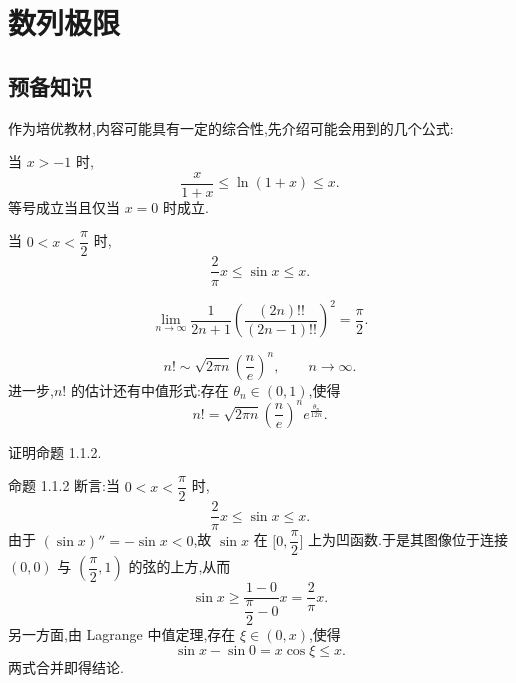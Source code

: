 \setcounter{chapter}{0}
\pagestyle{fancy}

\chapter{数列极限}


\section{预备知识}

作为培优教材,内容可能具有一定的综合性,先介绍可能会用到的几个公式:

\begin{proposition}
  当 $x>-1$ 时,
  \[
    \dfrac{x}{1+x}\leq \ln(1+x)\leq x.
  \]
  等号成立当且仅当 $x=0$ 时成立.
\end{proposition}

\begin{proposition}[\marktwostar]
  当 $0<x<\dfrac{\pi}{2}$ 时,
  \[
    \dfrac{2}{\pi}x\leq \sin x\leq x.
  \]
\end{proposition}

\begin{theorem}
  \[
    \displaystyle\lim\limits_{n\to\infty}
    \dfrac{1}{2n+1}
    \left(\dfrac{(2n)!!}{(2n-1)!!}\right)^2
    =\dfrac{\pi}{2}.
  \]
\end{theorem}

\begin{theorem}
  \[
    n!\sim \sqrt{2\pi n}\left(\dfrac{n}{e}\right)^n,
    \qquad n\to\infty.
  \]
  进一步,$n!$ 的估计还有中值形式:存在 $\theta_n\in(0,1)$,使得
  \[
    n!
    =\sqrt{2\pi n}\left(\dfrac{n}{e}\right)^n
    e^{\frac{\theta_n}{12n}}.
  \]
\end{theorem}

\begin{example}
  证明命题 1.1.2.
\end{example}
\exampleblank

\begin{solution}
  命题 1.1.2 断言:当 $0<x<\dfrac{\pi}{2}$ 时,
  \[
    \dfrac{2}{\pi}x\leq \sin x\leq x.
  \]
  由于 $(\sin x)''=-\sin x<0$,故 $\sin x$ 在
  $\lbrack0,\dfrac{\pi}{2}\rbrack$ 上为凹函数.于是其图像位于连接
  $(0,0)$ 与 $(\dfrac{\pi}{2},1)$ 的弦的上方,从而
  \[
    \sin x\geq \dfrac{1-0}{\dfrac{\pi}{2}-0}x=\dfrac{2}{\pi}x.
  \]
  另一方面,由 Lagrange 中值定理,存在 $\xi\in(0,x)$,使得
  \[
    \sin x-\sin0=x\cos\xi\leq x.
  \]
  两式合并即得结论.
\end{solution}


